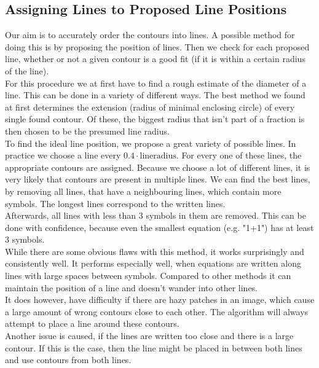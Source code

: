 \documentclass[12pt]{article}
\begin{document}
	
	
	
	
	\subsection{Assigning Lines to Proposed Line Positions}
	Our aim is to accurately order the contours into lines.
	A possible method for doing this is by proposing the position of lines.
	Then we check for each proposed line, whether or not a given contour is a good fit (if it is within a certain radius of the line).\\
	For this procedure we at first have to find a rough estimate of the diameter of a line.
	This can be done in a variety of different ways.
	The best method we found at first determines the extension (radius of minimal enclosing circle) of every single found contour.
	Of these, the biggest radius that isn't part of a fraction is then chosen to be the presumed line radius.\\
	To find the ideal line position, we propose a great variety of possible lines.
	In practice we choose a line every $0.4 \cdot \mathrm{line radius}$.
	For every one of these lines, the appropriate contours are assigned.
	Because we choose a lot of different lines, it is very likely that contours are present in multiple lines.
	We can find the best lines, by removing all lines, that have a neighbouring lines, which contain more symbols.
	The longest lines correspond to the written lines.\\
	Afterwards, all lines with less than 3 symbols in them are removed.
	This can be done with confidence, because even the smallest equation (e.g. "1+1") has at least 3 symbols.\\
	
	While there are some obvious flaws with this method, it works surprisingly and consistently well.
	It performs especially well, when equations are written along lines with large spaces between symbols.
	Compared to other methods it can maintain the position of a line and doesn't wander into other lines.\\
	It does however, have difficulty if there are hazy patches in an image, which cause a large amount of wrong contours close to each other.
	The algorithm will always attempt to place a line around these contours.\\
	Another issue is caused, if the lines are written too close and there is a large contour.
	If this is the case, then the line might be placed in between both lines and use contours from both lines.
	
\end{document}
